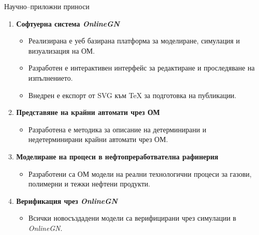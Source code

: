 \documentclass[aspectratio=169]{beamer}
\begin{document}
\begin{frame}{Научно--приложни приноси}
\scriptsize
\begin{enumerate}
    \setlength{\itemsep}{0.8em}

    \item \textbf{Софтуерна система \textit{OnlineGN}}
    \begin{itemize}
        \item Реализирана е уеб базирана платформа за моделиране, симулация и визуализация на ОМ.
        \item Разработен е интерактивен интерфейс за редактиране и проследяване на изпълнението.
        \item Внедрен е експорт от SVG към \TeX{} за подготовка на публикации.
    \end{itemize}

    \item \textbf{Представяне на крайни автомати чрез ОМ}
    \begin{itemize}
        \item Разработена е методика за описание на детерминирани и недетерминирани крайни автомати чрез ОМ.
    \end{itemize}

    \item \textbf{Моделиране на процеси в нефтопреработвателна рафинерия}
    \begin{itemize}
        \item Разработени са ОМ модели на реални технологични процеси за газови, полимерни и тежки нефтени продукти.
    \end{itemize}

    \item \textbf{Верификация чрез \textit{OnlineGN}}
    \begin{itemize}
        \item Всички новосъздадени модели са верифицирани чрез симулации в \textit{OnlineGN}.
    \end{itemize}
\end{enumerate}
\end{frame}
\end{document}
